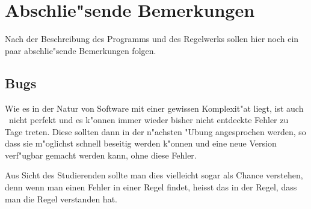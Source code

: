 
\chapter{Abschlie"sende Bemerkungen}

Nach der Beschreibung des Programms und des Regelwerks sollen hier noch ein paar abschlie"sende
Bemerkungen folgen.



\section{Bugs}

Wie es in der Natur von Software mit einer gewissen Komplexit"at liegt, ist auch \TPML\ nicht
perfekt und es k"onnen immer wieder bisher nicht entdeckte Fehler zu Tage treten. Diese sollten
dann in der n"achsten "Ubung angesprochen werden, so dass sie m"oglichst schnell beseitig
werden k"onnen und eine neue Version verf"ugbar gemacht werden kann, ohne diese Fehler.

Aus Sicht des Studierenden sollte man dies vielleicht sogar als Chance verstehen, denn wenn
man einen Fehler in einer Regel findet, heisst das in der Regel, dass man die Regel verstanden
hat.



